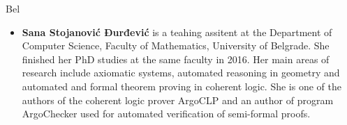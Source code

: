 \begin{sitedescription}{Bel}
\begin{itemize}
  \item{\bf Sana Stojanović Đurđević} is a teahing assitent at the
    Department of Computer Science, Faculty of Mathematics, University
    of Belgrade. She finished her PhD studies at the same faculty in
    2016.  Her main areas of research include axiomatic systems,
    automated reasoning in geometry and automated and formal theorem
    proving in coherent logic. She is one of the authors of the
    coherent logic prover ArgoCLP and an author of program ArgoChecker
    used for automated verification of semi-formal proofs.

  \end{itemize}
    
  
  
\end{sitedescription}

